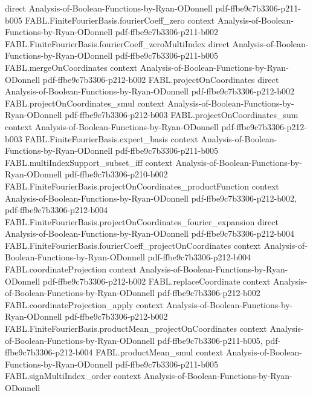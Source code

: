 \begin{theorem}
  {direct}
  {Analysis-of-Boolean-Functions-by-Ryan-ODonnell}
  {pdf-ffbe9c7b3306-p211-b005}
\proofstep
  {FABL.FiniteFourierBasis.fourierCoeff_zero}
  {context}
  {Analysis-of-Boolean-Functions-by-Ryan-ODonnell}
  {pdf-ffbe9c7b3306-p211-b002}
\proofstep
  {FABL.FiniteFourierBasis.fourierCoeff_zeroMultiIndex}
  {direct}
  {Analysis-of-Boolean-Functions-by-Ryan-ODonnell}
  {pdf-ffbe9c7b3306-p211-b005}
\proofstep
  {FABL.mergeOnCoordinates}
  {context}
  {Analysis-of-Boolean-Functions-by-Ryan-ODonnell}
  {pdf-ffbe9c7b3306-p212-b002}
\proofstep
  {FABL.projectOnCoordinates}
  {direct}
  {Analysis-of-Boolean-Functions-by-Ryan-ODonnell}
  {pdf-ffbe9c7b3306-p212-b002}
\proofstep
  {FABL.projectOnCoordinates_smul}
  {context}
  {Analysis-of-Boolean-Functions-by-Ryan-ODonnell}
  {pdf-ffbe9c7b3306-p212-b003}
\proofstep
  {FABL.projectOnCoordinates_sum}
  {context}
  {Analysis-of-Boolean-Functions-by-Ryan-ODonnell}
  {pdf-ffbe9c7b3306-p212-b003}
\proofstep
  {FABL.FiniteFourierBasis.expect_basis}
  {context}
  {Analysis-of-Boolean-Functions-by-Ryan-ODonnell}
  {pdf-ffbe9c7b3306-p211-b005}
\proofstep
  {FABL.multiIndexSupport_subset_iff}
  {context}
  {Analysis-of-Boolean-Functions-by-Ryan-ODonnell}
  {pdf-ffbe9c7b3306-p210-b002}
\proofstep
  {FABL.FiniteFourierBasis.projectOnCoordinates_productFunction}
  {context}
  {Analysis-of-Boolean-Functions-by-Ryan-ODonnell}
  {pdf-ffbe9c7b3306-p212-b002,
    pdf-ffbe9c7b3306-p212-b004}
\proofstep
  {FABL.FiniteFourierBasis.projectOnCoordinates_fourier_expansion}
  {direct}
  {Analysis-of-Boolean-Functions-by-Ryan-ODonnell}
  {pdf-ffbe9c7b3306-p212-b004}
\proofstep
  {FABL.FiniteFourierBasis.fourierCoeff_projectOnCoordinates}
  {context}
  {Analysis-of-Boolean-Functions-by-Ryan-ODonnell}
  {pdf-ffbe9c7b3306-p212-b004}
\proofstep
  {FABL.coordinateProjection}
  {context}
  {Analysis-of-Boolean-Functions-by-Ryan-ODonnell}
  {pdf-ffbe9c7b3306-p212-b002}
\proofstep
  {FABL.replaceCoordinate}
  {context}
  {Analysis-of-Boolean-Functions-by-Ryan-ODonnell}
  {pdf-ffbe9c7b3306-p212-b002}
\proofstep
  {FABL.coordinateProjection_apply}
  {context}
  {Analysis-of-Boolean-Functions-by-Ryan-ODonnell}
  {pdf-ffbe9c7b3306-p212-b002}
\proofstep
  {FABL.FiniteFourierBasis.productMean_projectOnCoordinates}
  {context}
  {Analysis-of-Boolean-Functions-by-Ryan-ODonnell}
  {pdf-ffbe9c7b3306-p211-b005,
    pdf-ffbe9c7b3306-p212-b004}
\proofstep
  {FABL.productMean_smul}
  {context}
  {Analysis-of-Boolean-Functions-by-Ryan-ODonnell}
  {pdf-ffbe9c7b3306-p211-b005}
\proofstep
  {FABL.signMultiIndex_order}
  {context}
  {Analysis-of-Boolean-Functions-by-Ryan-ODonnell}

\end{theorem}
